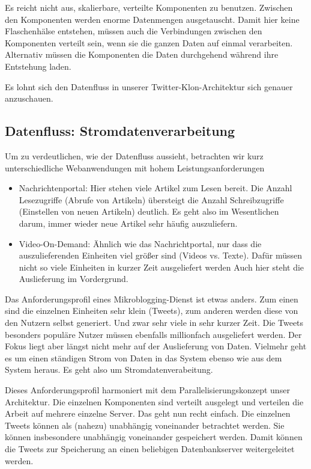 \begin{itemize}
Es reicht nicht aus, skalierbare, verteilte Komponenten zu benutzen. Zwischen den Komponenten werden enorme
Datenmengen ausgetauscht. Damit hier keine Flaschenhälse entstehen, müssen auch die Verbindungen zwischen
den Komponenten verteilt sein, wenn sie die ganzen Daten auf einmal verarbeiten. Alternativ müssen die
Komponenten die Daten durchgehend während ihre Entstehung laden.

Es lohnt sich den Datenfluss in unserer Twitter-Klon-Architektur sich genauer anzuschauen.

\subsection{Datenfluss: Stromdatenverarbeitung}
Um zu verdeutlichen, wie der Datenfluss aussieht, betrachten wir kurz unterschiedliche Webanwendungen mit hohem
Leistungsanforderungen
\begin{itemize}
  \item Nachrichtenportal: Hier stehen viele Artikel zum Lesen bereit. Die Anzahl Lesezugriffe (Abrufe von Artikeln)
  übersteigt die Anzahl Schreibzugriffe (Einstellen von neuen Artikeln) deutlich. Es geht also im Wesentlichen darum,
  immer wieder neue Artikel sehr häufig auszuliefern.
  \item Video-On-Demand: Ähnlich wie das Nachrichtportal, nur dass die auszulieferenden Einheiten viel größer
  sind (Videos vs. Texte). Dafür müssen nicht so viele Einheiten in kurzer Zeit ausgeliefert werden
  Auch hier steht die Auslieferung im Vordergrund.
\end{itemize}
Das Anforderungsprofil eines Mikroblogging-Dienst ist etwas anders. Zum einen sind die einzelnen Einheiten sehr klein
(Tweets), zum anderen werden diese von den Nutzern selbst generiert. Und zwar sehr viele in sehr kurzer Zeit.
Die Tweets besonders populäre Nutzer müssen ebenfalls millionfach ausgeliefert werden. Der Fokus liegt aber
längst nicht mehr auf der Auslieferung von Daten. Vielmehr geht es um einen ständigen Strom von Daten
in das System ebenso wie aus dem System heraus. Es geht also um Stromdatenverabeitung.

Dieses Anforderungsprofil harmoniert mit dem Parallelisierungskonzept unser Architektur. Die einzelnen Komponenten
sind verteilt ausgelegt und verteilen die Arbeit auf mehrere einzelne Server. Das geht nun recht einfach. Die
einzelnen Tweets können als (nahezu) unabhängig voneinander betrachtet werden. Sie können insbesondere unabhängig
voneinander gespeichert werden. Damit können die Tweets zur Speicherung an einen beliebigen Datenbankserver weitergeleitet
werden.


\end{itemize}
